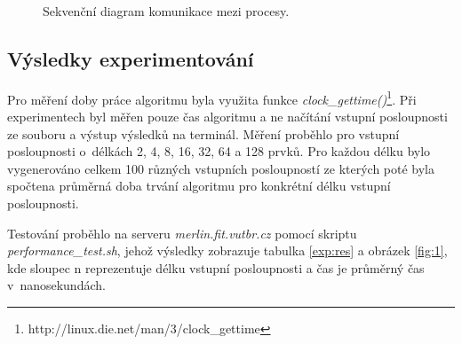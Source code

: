 \documentclass[10pt,a4paper,notitlepage]{article}
\begin{document}
\begin{figure}[h]
	\centering
  \label{pic:3}
  \caption{Sekvenční diagram komunikace mezi procesy.}
\end{figure}

\subsection{Výsledky experimentování}
Pro měření doby práce algoritmu byla využita funkce
\textit{clock\_gettime()}\footnote{http://linux.die.net/man/3/clock\_gettime}.
Při experimentech byl měřen pouze čas algoritmu a ne načítání vstupní
posloupnosti ze souboru a výstup výsledků na terminál. Měření proběhlo pro
vstupní posloupnosti o~délkách 2, 4, 8, 16, 32, 64 a 128 prvků. Pro každou délku
bylo vygenerováno celkem 100 různých vstupních posloupností ze kterých poté byla spočtena
průměrná doba trvání algoritmu pro konkrétní délku vstupní posloupnosti.

Testování proběhlo na serveru \textit{merlin.fit.vutbr.cz} pomocí skriptu
\textit{performance\_test.sh}, jehož výsledky zobrazuje tabulka \ref{exp:res} a
obrázek \ref{fig:1}, kde sloupec n reprezentuje délku vstupní posloupnosti a čas
je průměrný čas v~nanosekundách.
\end{document}
